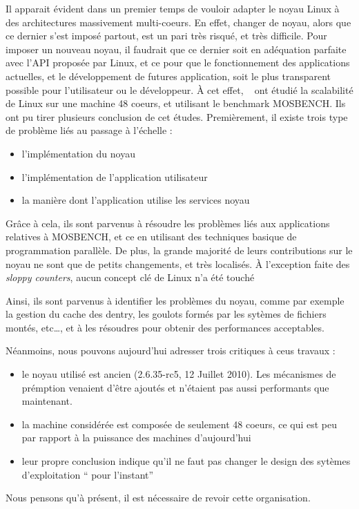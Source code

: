       Il apparait évident dans un premier temps de vouloir adapter le noyau
      Linux à des architectures massivement multi-coeurs. En effet, changer de
      noyau, alors que ce dernier s’est imposé partout, est un pari très risqué,
      et très difficile. Pour imposer un nouveau noyau, il faudrait que ce
      dernier soit en adéquation parfaite avec l’API proposée par Linux, et ce
      pour que le fonctionnement des applications actuelles, et le développement
      de futures application, soit le plus transparent possible pour
      l’utilisateur ou le développeur. À cet effet, ~\citet{boyd2010analysis}
      ont étudié la scalabilité de Linux sur une machine
      48 coeurs, et utilisant le benchmark MOSBENCH. Ils ont pu tirer plusieurs
      conclusion de cet études.  Premièrement, il existe trois type de problème
      liés au passage à l’échelle :
      \begin{itemize}
        \item l’implémentation du noyau
        \item l’implémentation de l’application utilisateur
        \item la manière dont l’application utilise les services noyau
      \end{itemize}
      Grâce à cela, ils sont parvenus à résoudre les problèmes liés aux
      applications relatives à MOSBENCH, et ce en utilisant des techniques
      basique de programmation parallèle. De plus, la grande majorité de leurs
      contributions sur le noyau ne sont que de petits changements, et très
      localisés. À l’exception faite des \textit{sloppy counters}, aucun concept
      clé de Linux n'a été touché

      Ainsi, ils sont parvenus à identifier les problèmes du noyau, comme par
      exemple la gestion du cache des dentry, les goulots formés par les sytèmes
      de fichiers montés, etc\ldots, et à les résoudres pour obtenir des
      performances acceptables.

      Néanmoins, nous pouvons aujourd’hui adresser trois critiques à ceus
      travaux :
      \begin{itemize}
        \item le noyau utilisé est ancien (2.6.35-rc5, 12 Juillet 2010). Les
          mécanismes de prémption venaient d’être ajoutés et n’étaient pas aussi
          performants que maintenant.
        \item la machine considérée est composée de seulement 48 coeurs, ce qui
          est peu par rapport à la puissance des machines d’aujourd’hui
        \item leur propre conclusion indique qu’il ne faut pas changer le design
          des sytèmes d’exploitation `` pour l’instant''
      \end{itemize}
      Nous pensons qu’à présent, il est nécessaire de revoir cette organisation.

